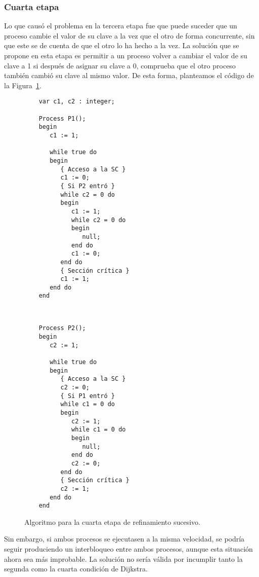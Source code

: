\subsubsection{Cuarta etapa}
Lo que causó el problema en la tercera etapa fue que puede suceder que un proceso cambie el valor de su clave a la vez que el otro de forma concurrente, sin que este se de cuenta de que el otro lo ha hecho a la vez. La solución que se propone en esta etapa es permitir a un proceso volver a cambiar el valor de su clave a 1 si después de asignar su clave a 0, comprueba que el otro proceso también cambió su clave al mismo valor. De esta forma, planteamos el código de la Figura~\ref{fig:cod_cuarta_etapa}.\\
\begin{figure}
\setlength{\columnsep}{1cm}
\begin{multicols}{2}
    \begin{verbatim}
    var c1, c2 : integer;

    Process P1();
    begin
       c1 := 1;

       while true do
       begin
          { Acceso a la SC }
          c1 := 0;
          { Si P2 entró }
          while c2 = 0 do
          begin
             c1 := 1;
             while c2 = 0 do
             begin
                null;
             end do
             c1 := 0;
          end do
          { Sección crítica }
          c1 := 1;
       end do
    end
\end{verbatim}
\begin{verbatim}


    Process P2();
    begin
       c2 := 1;

       while true do
       begin
          { Acceso a la SC }
          c2 := 0;
          { Si P1 entró }
          while c1 = 0 do
          begin
             c2 := 1;
             while c1 = 0 do
             begin
                null;
             end do
             c2 := 0;
          end do
          { Sección crítica }
          c2 := 1;
       end do
    end
\end{verbatim}
\end{multicols}
\caption{Algoritmo para la cuarta etapa de refinamiento sucesivo.}
\label{fig:cod_cuarta_etapa}
\end{figure}
Sin embargo, si ambos procesos se ejecutasen a la misma velocidad, se podría seguir produciendo un interbloqueo entre ambos procesos, aunque esta situación ahora sea más improbable. La solución no sería válida por incumplir tanto la segunda como la cuarta condición de Dijkstra.\\


